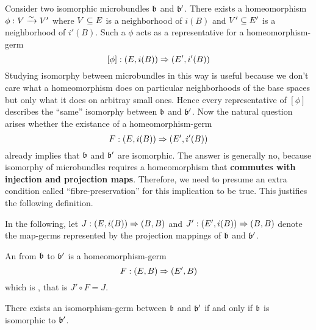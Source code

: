 \begin{myparagraph}
    Consider two isomorphic microbundles $\mathfrak{b}$ and $\mathfrak{b}'$.
    There exists a homeomorphism $\phi: V \xrightarrow{\sim} V'$ where $V \subseteq{} E$ is a neighborhood of $i(B)$ and $V' \subseteq{} E'$ is a neighborhood of $i'(B)$.
    Such a $\phi$ acts as a representative for a homeomorphism-germ
    \[ [\phi]: (E, i(B)) \Rightarrow (E', i'(B)) \]
    Studying isomorphy between microbundles in this way is useful because we don't care what a
    homeomorphism does on particular neighborhoods of the base spaces but only what it does on arbitray small ones.
    Hence every representative of $[\phi]$ describes the ``same'' isomorphy between $\mathfrak{b}$ and $\mathfrak{b}'$.
    Now the natural question arises whether the existance of a homeomorphism-germ
    \[ F: (E, i(B)) \Rightarrow (E', i'(B)) \]
    already implies that $\mathfrak{b}$ and $\mathfrak{b}'$ are isomorphic.
    The answer is generally no, because isomorphy of microbundles requires 
    a homeomorphism that \textbf{commutes with injection and projection maps}.
    Therefore, we need to presume an extra condition called ``fibre-preservation'' for this implication to be true.
    This justifies the following definition.
    
    In the following, let $J: (E, i(B)) \Rightarrow (B, B)$ and $J': (E', i(B)) \Rightarrow (B, B)$ denote the map-germs represented by the projection mappings of $\mathfrak{b}$ and $\mathfrak{b}'$.
\end{myparagraph}

\begin{mydefinition}
    An  from $\mathfrak{b}$ to $\mathfrak{b}'$ is a homeomorphism-germ 
    \[ F: (E, B) \Rightarrow (E', B) \]
    which is , that is $J' \circ F = J$.
\end{mydefinition}

\begin{myremark}
    There exists an isomorphism-germ between $\mathfrak{b}$ and $\mathfrak{b}'$ if and only if $\mathfrak{b}$ is isomorphic to $\mathfrak{b}'$.
\end{myremark}
